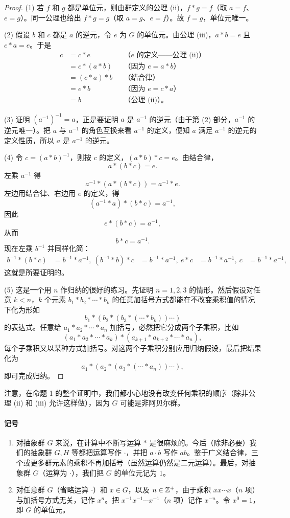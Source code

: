 \begin{proof}
(1) 若 $f$ 和 $g$ 都是单位元，则由群定义的公理 (ii)，$f*g=f$（取 $a=f$、$e=g$）。同一公理也给出 $f*g=g$（取 $a=g$、$e=f$）。故 $f=g$，单位元唯一。

(2) 假设 $b$ 和 $c$ 都是 $a$ 的逆元，令 $e$ 为 $G$ 的单位元。由公理 (iii)，$a*b=e$ 且 $c*a=e$。于是
\begin{align*}
  c &= c*e &&\text{（$e$ 的定义——公理 (ii)）}\\
    &= c*(a*b) &&\text{（因为 $e=a*b$）}\\
    &= (c*a)*b &&\text{（结合律）}\\
    &= e*b &&\text{（因为 $e=c*a$）}\\
    &= b &&\text{（公理 (ii)）。}
\end{align*}

(3) 证明 $(a^{-1})^{-1}=a$，正是要证明 $a$ 是 $a^{-1}$ 的逆元（由于第 (2) 部分，$a^{-1}$ 的逆元唯一）。把 $a$ 与 $a^{-1}$ 的角色互换来看 $a^{-1}$ 的定义，便知 $a$ 满足 $a^{-1}$ 的逆元的定义性质，所以 $a$ 是 $a^{-1}$ 的逆元。

(4) 令 $c=(a*b)^{-1}$，则按 $c$ 的定义，$(a*b)*c=e$。由结合律，
\[
  a*(b*c)=e.
\]
左乘 $a^{-1}$ 得
\[
  a^{-1}*(a*(b*c))=a^{-1}*e.
\]
左边用结合律、右边用 $e$ 的定义，得
\[
  (a^{-1}*a)*(b*c)=a^{-1},
\]
因此
\[
  e*(b*c)=a^{-1},
\]
从而
\[
  b*c=a^{-1}.
\]
现在左乘 $b^{-1}$ 并同样化简：
\begin{align*}
  b^{-1}*(b*c)&=b^{-1}*a^{-1},\
  (b^{-1}*b)*c&=b^{-1}*a^{-1},\
  e*c&=b^{-1}*a^{-1},\
  c&=b^{-1}*a^{-1},
\end{align*}
这就是所要证明的。

(5) 这是一个用 $n$ 作归纳的很好的练习。先证明 $n=1,2,3$ 的情形。然后假设对任意 $k<n$，$k$ 个元素 $b_1*b_2*\cdots*b_k$ 的任意加括号方式都能在不改变乘积值的情况下化为形如
\[
  b_1*(b_2*(b_3*(\cdots*b_k))\cdots)
\]
的表达式。任意给 $a_1*a_2*\cdots*a_n$ 加括号，必然把它分成两个子乘积，比如
\[
  (a_1*a_2*\cdots*a_k)*(a_{k+1}*a_{k+2}*\cdots*a_n),
\]
每个子乘积又以某种方式加括号。对这两个子乘积分别应用归纳假设，最后把结果化为
\[
  a_1*(a_2*(a_3*(\cdots*a_n))\cdots),
\]
即可完成归纳。
\end{proof}

注意，在命题 1 的整个证明中，我们都小心地没有改变任何乘积的顺序（除非公理 (ii) 和 (iii) 允许这样做），因为 $G$ 可能是非阿贝尔群。

\paragraph{记号}
\begin{enumerate}[label=(\arabic*)]
  \item 对抽象群 $G$ 来说，在计算中不断写运算 $*$ 是很麻烦的。今后（除非必要）我们的抽象群 $G,H$ 等都把运算写作 $\cdot$，并把 $a\cdot b$ 写作 $ab$。鉴于广义结合律，三个或更多群元素的乘积不再加括号（虽然运算仍然是二元运算）。最后，对抽象群 $G$（运算为 $\cdot$），我们把 $G$ 的单位元记为 $1$。
  \item 对任意群 $G$（省略运算 $\cdot$）和 $x\in G$，以及 $n\in\mathbb{Z}^+$，由于乘积 $xx\cdots x$（$n$ 项）与加括号方式无关，记作 $x^n$。把 $x^{-1}x^{-1}\cdots x^{-1}$（$n$ 项）记作 $x^{-n}$。令 $x^0=1$，即 $G$ 的单位元。
\end{enumerate}

